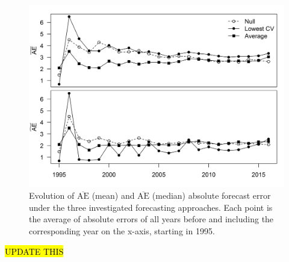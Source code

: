 \documentclass[12pt,]{book}
\theoremstyle{definition}
\theoremstyle{definition}
\theoremstyle{definition}
\theoremstyle{remark}
\begin{document}
\begin{figure}
  \centering
  \includegraphics{img/Ch2/ae-changes.png}
  \caption{Evolution of $\overline{\text{AE}}$ (mean) and  $\overline{\text{AE}}$ (median) absolute forecast error under the three investigated forecasting approaches. Each point is the average of absolute errors of all years before and including the corresponding year on the x-axis, starting in 1995.}
  \label{fig:ae-changes}
\end{figure}

\clearpage

\hl{UPDATE THIS}
\end{document}

